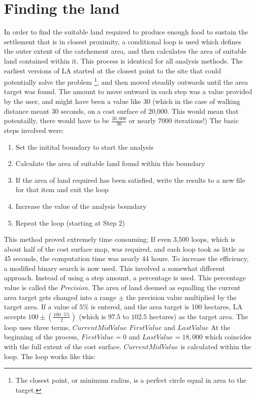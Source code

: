 \section{Finding the land} 

In order to find the suitable land required
to produce enough food to sustain the settlement that is in closest proximity, 
a conditional loop is used which defines the outer extent of the catchement
area, 
and then calculates the area of suitable land contained within it.  This process
is identical for all
analysis methods.  The earliest versions of LA started at the
closest point to the site that could potentially solve the problem
\footnote{The closest point, or minimum radius, is a perfect circle equal in
area to the target.}, and then moved steadily outwards until the area target
was found.  The amount to move outward in each step was a value provided by the
user, and might have been a value like 30 (which in the case of walking
distance meant 30 seconds, on  a cost surface of 20,000.  This would mean that
potentailly, there would have to be $\frac{20,000}{30}$ or nearly 7000
iterations!)
The basic steps involved were:

   \begin{enumerate} 
   
   \item  Set the initital boundary to start the analysis
   
   \item  Calculate the area of suitable land found within this boundary 
   
   \item If the area of land required has been satisfied, write the results to a
new
   file for that item and exit the loop 
   
   \item  Increase the value of the analysis boundary 
   
   \item  Repeat the loop (starting at Step 2)
   
   \end{enumerate}

This method proved extremely time consuming;  If even 3,500 loops, which is
about half of the cost surface map, was required, and each loop took as little
as 45 seconds, the computation time was nearly 44 hours.   To increase the
efficiency, a modified binary search is now used.  This involved a somewhat
different approach.  Instead of using a step amount, a percentage is used.
This percentage value is called the \textit{Precision}. 
The area of land deemed as equalling the current area target gets changed into
a range $\pm$ the precision value multiplied by the target area. 
If a value of $5\%$ is entered, and the area
target is 100 hectares, LA accepts $100 \pm(\frac{100 \cdot
5\%}{2})$ (which is $97.5$ to $102.5$ hectares) as the target area.  The loop
uses three terms, $CurrentMidValue$ $FirstValue$ and $LastValue$ At the
beginning of the process, $FirstValue=0$ and $LastValue=18,000$ which coincides
with the full extent of the cost surface.  $CurrentMidValue$ is calculated
within the loop.  The loop works like this:

